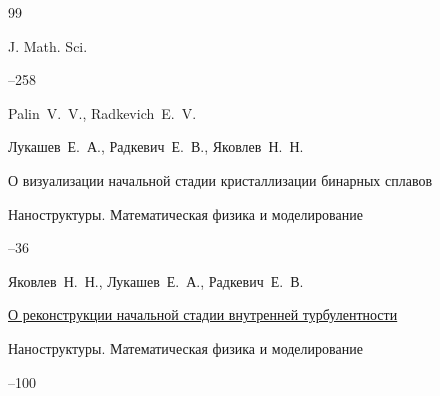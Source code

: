 \begin{thebibliography}{99}

\jour  J. Math. Sci.



--258

\by  Palin~V.~V.,  Radkevich~E.~V.














\by Лукашев~Е.~А., Радкевич~Е.~В., Яковлев~Н.~Н.

\paper О визуализации начальной стадии кристаллизации бинарных сплавов

\jour Наноструктуры. Математическая физика и моделирование




--36















\by Яковлев~Н.~Н., Лукашев~Е.~А., Радкевич~Е.~В.

\paper \href{https://elibrary.ru/item.asp?id=24258345}{О реконструкции начальной стадии внутренней турбулентности}

\jour Наноструктуры. Математическая физика и моделирование




--100






\end{thebibliography}
